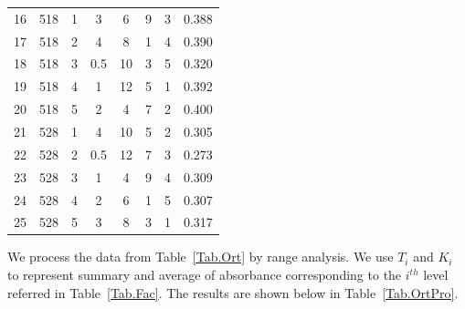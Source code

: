 \documentclass[journal=jacsat,manuscript=article]{achemso}
\begin{document}
\begin{table}[H]
\begin{tabular}{cccccccc}
    16    & 518           & 1 & 3                  & 6     & 9                  & 3 & 0.388     \\
    17    & 518           & 2 & 4                  & 8     & 1                  & 4 & 0.390     \\
    18    & 518           & 3 & 0.5                & 10    & 3                  & 5 & 0.320     \\
    19    & 518           & 4 & 1                  & 12    & 5                  & 1 & 0.392     \\
    20    & 518           & 5 & 2                  & 4     & 7                  & 2 & 0.400     \\
    21    & 528           & 1 & 4                  & 10    & 5                  & 2 & 0.305     \\
    22    & 528           & 2 & 0.5                & 12    & 7                  & 3 & 0.273     \\
    23    & 528           & 3 & 1                  & 4     & 9                  & 4 & 0.309     \\
    24    & 528           & 4 & 2                  & 6     & 1                  & 5 & 0.307     \\
    25    & 528           & 5 & 3                  & 8     & 3                  & 1 & 0.317     \\
    \bottomrule
    \end{tabular}
\end{table}

We process the data from Table~\ref{Tab.Ort} by range analysis. We use $T_i$ and $K_i$ to represent summary and average of absorbance corresponding to the $i^{th}$ level referred in Table~\ref{Tab.Fac}. The results are shown below in Table~\ref{Tab.OrtPro}.
\end{document}
